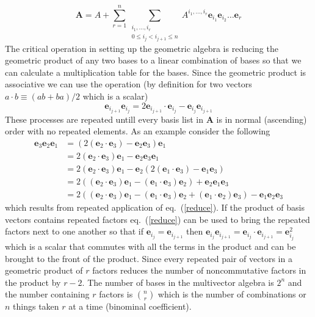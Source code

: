 \documentclass[12pt,twoside,openright]{memoir}
\newcommand{\bm}[1]{\boldsymbol{#1}}
\newcommand{\lp}{\left (}
\newcommand{\rp}{\right )}
\newcommand{\paren}[1]{\lp {#1} \rp}
\newcommand{\eb}{\bm{e}}
\begin{document}
   \begin{equation}
      \bm{A} = A + \sum_{r=1}^{n}\sum_{\substack{i_{1},\dots,i_{r}\\ 0\le i_{j}<i_{j+1} \le n}} 
               A^{i_{1},\dots,i_{r}}\eb_{i_{1}}\eb_{i_{2}}\dots \eb_{r}
   \end{equation}
The critical operation in setting up the geometric algebra is reducing
the geometric product of any two bases to a linear combination of bases so that
we can calculate a multiplication table for the bases.  Since the geometric
product is associative we can use the operation (by definition for two vectors
$a\cdot b \equiv (ab+ba)/2$  which is a scalar)
   \begin{equation}\label{reduce}
      \eb_{i_{j+1}}\eb_{i_{j}} = 2\eb_{i_{j+1}}\cdot \eb_{i_{j}} - \eb_{i_{j}}\eb_{i_{j+1}}
   \end{equation}
These processes are repeated untill every basis list in $\bm{A}$ is in normal
(ascending) order with no repeated elements. As an example consider the
following
   \begin{align}
      \eb_{3}\eb_{2}\eb_{1} &= (2(\eb_{2}\cdot \eb_{3}) - \eb_{2}\eb_{3})\eb_{1} \\
                      &= 2\paren{\eb_{2}\cdot \eb_{3}}\eb_{1} - \eb_{2}\eb_{3}\eb_{1} \\
                      &= 2\paren{\eb_{2}\cdot \eb_{3}}\eb_{1} - \eb_{2}\paren{2\paren{\eb_{1}\cdot \eb_{3}}-\eb_{1}\eb_{3}} \\
                      &= 2\paren{\paren{\eb_{2}\cdot \eb_{3}}\eb_{1}-\paren{\eb_{1}\cdot \eb_{3}}\eb_{2}}+\eb_{2}\eb_{1}\eb_{3} \\
                      &= 2\paren{\paren{\eb_{2}\cdot \eb_{3}}\eb_{1}-\paren{\eb_{1}\cdot \eb_{3}}\eb_{2}+
                         \paren{\eb_{1}\cdot \eb_{2}}\eb_{3}}-\eb_{1}\eb_{2}\eb_{3}
   \end{align}
which results from repeated application of eq.~(\ref{reduce}).  If the product of basis vectors contains repeated factors
eq.~(\ref{reduce}) can be used to bring the repeated factors next to one another so that if $\eb_{i_{j}} = \eb_{i_{j+1}}$
then $\eb_{i_{j}}\eb_{i_{j+1}} = \eb_{i_{j}}\cdot \eb_{i_{j+1}} = \eb_{i_{j}}^{2}$ which is a scalar that commutes with all the terms in the product
and can be brought to the front of the product.  Since every repeated pair of vectors in a geometric product of $r$ factors
reduces the number of noncommutative factors in the product by $r-2$. The number of bases in the multivector algebra is $2^{n}$
and the number containing $r$ factors is ${n\choose r}$ which is the number of combinations or $n$ things
taken $r$ at a time (binominal coefficient).
\end{document}
